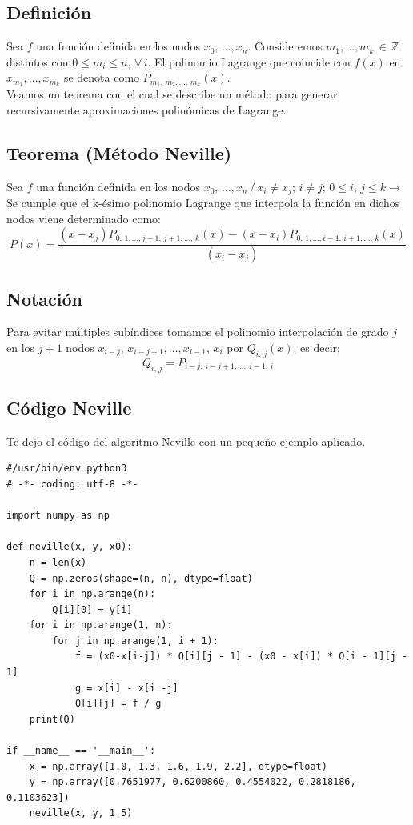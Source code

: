 \documentclass[12pt,a4paper,oneside]{scrbook}
\newcounter{ns}
\begin{document}
\subsection*{Definición}
Sea $f$ una función definida en los nodos $x_0,\,\dots ,x_n$. Consideremos $m_1,\dots ,m_k\,\in\,\mathbb{Z}$ distintos con $0\leq m_i\leq n,\,\forall\, i$. El polinomio Lagrange que coincide con $f(x)$ en $x_{m_1},\dots ,x_{m_k}$ se denota como $P_{m_1,\, m_2,\dots ,\, m_k}(x)$.\\
Veamos un teorema con el cual se describe un método para generar recursivamente aproximaciones polinómicas de Lagrange.
\subsection*{Teorema (Método Neville)}
Sea $f$ una función definida en los nodos $x_0,\,\dots ,x_n\,/\, x_i\neq x_j;\,i\neq j;\, 0\leq i,\, j\leq k \longrightarrow $ Se cumple que el k-ésimo polinomio Lagrange que interpola la función en dichos nodos viene determinado como:
\[
P(x)=\dfrac{(x-x_j)P_{0,\,1,\dots ,j-1,\,j+1,\dots ,\, k}(x)-(x-x_i)P_{0,\,1,\dots ,i-1,\,i+1,\dots ,\, k}(x) }{(x_i-x_j)}
\]
\subsection*{Notación}
Para evitar múltiples subíndices tomamos el polinomio interpolación de grado $j$ en los $j+1$ nodos $x_{i-j},\, x_{i-j+1},\dots ,x_{i-1},\, x_i$ por $Q_{i,\, j}(x)$, es decir;
\[
Q_{i,\, j} = P_{i-j,\, i-j+1,\,\dots ,i-1,\, i}
\]
\subsection*{Código Neville}
Te dejo el código del algoritmo Neville con un pequeño ejemplo aplicado.
\begin{lstlisting}[frame=none]
#/usr/bin/env python3
# -*- coding: utf-8 -*-

import numpy as np

def neville(x, y, x0):
    n = len(x)
    Q = np.zeros(shape=(n, n), dtype=float)
    for i in np.arange(n):
        Q[i][0] = y[i]
    for i in np.arange(1, n):
        for j in np.arange(1, i + 1):
            f = (x0-x[i-j]) * Q[i][j - 1] - (x0 - x[i]) * Q[i - 1][j - 1]
            g = x[i] - x[i -j]
            Q[i][j] = f / g
    print(Q)

if __name__ == '__main__':
    x = np.array([1.0, 1.3, 1.6, 1.9, 2.2], dtype=float)
    y = np.array([0.7651977, 0.6200860, 0.4554022, 0.2818186, 0.1103623])
    neville(x, y, 1.5)
\end{lstlisting}
\end{document}
